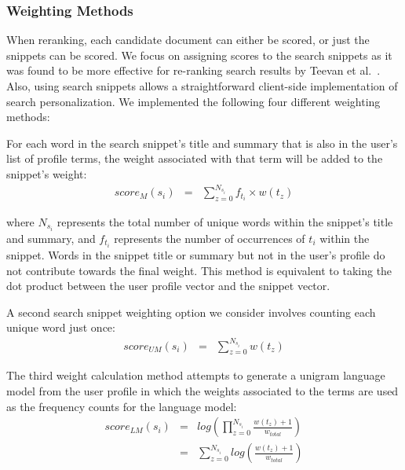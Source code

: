 \documentclass{sig-alternate}
\begin{document}
\subsubsection{Weighting Methods}

When reranking, each candidate document can either be scored, or just the snippets can be scored. We focus on assigning scores to the search snippets as it was found to be more effective for re-ranking search results by Teevan et al.~\cite{Teevan:Main}. Also, using search snippets allows a straightforward client-side implementation of search personalization. We implemented the following four different weighting methods:

\vspace{3mm}

For each word in the search snippet's title and summary that is also in the user's list of profile terms, the weight associated with that term will be added to the snippet's weight: 
\begin{eqnarray}
score_{M}(s_i) & = & \sum_{z = 0}^{N_{s_i}} f{_{t_i}} \times w(t_z)
\end{eqnarray}

where $N_{s_i}$ represents the total number of unique words within the snippet's title and summary, and $f_{t_i}$ represents the number of occurrences of $t_i$ within the snippet. Words in the snippet title or summary but not in the user's profile do not contribute towards the final weight. This method is equivalent to taking the dot product between the user profile vector and the snippet vector.

\vspace{3mm}

A second search snippet weighting option we consider involves counting each unique word just once:
\begin{eqnarray}
score{_{UM}}(s_i) & = & \sum_{z = 0}^{N_{s_i}} w(t_z)
\end{eqnarray}

\vspace{3mm}

The third weight calculation method attempts to generate a unigram language model from the user profile in which the weights associated to the terms are used as the frequency counts for the language model:
\begin{eqnarray}
score{_{LM}}(s{_{i}}) & = & log( \prod_{z = 0}^{N{_{s{_{i}}}}} \frac{w(t{_{z}}) + 1}{w{_{total}}}) \nonumber \\
& = & \sum_{z = 0}^{N{_{s{_{i}}}}} log(\frac{w(t{_{z}}) + 1}{w{_{total}}})
\end{eqnarray}
\end{document}
